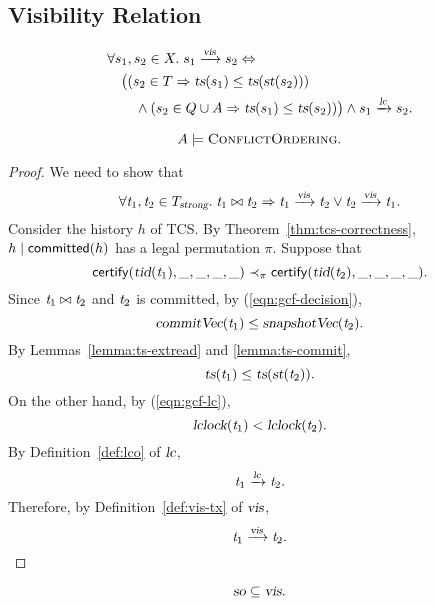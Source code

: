 
\subsection{Visibility Relation}  \label{ss:vis}

\begin{appdefinition} \label{def:vis-tx}
  \begin{align*}
    &\forall \txevents_{1}, \txevents_{2} \in X.\;
      \txevents_{1} \rel{\vis} \txevents_{2} \iff \\
      &\quad \big((\txevents_{2} \in \txs \implies
        \timestamp(\txevents_{1}) \le \timestamp(\startoftx(\txevents_{2}))) \\
        &\quad\quad \land (\txevents_{2} \in \Fence \cup \Attach \implies \timestamp(\txevents_{1}) \le \timestamp(\txevents_{2}))\big)
          \land \txevents_{1} \rel{\lcorder} \txevents_{2}.
  \end{align*}
\end{appdefinition}

\begin{apptheorem} \label{thm:conflictaxiom}
  \[
    A \models \textsc{ConflictOrdering}.
  \]
\end{apptheorem}

\begin{proof} \label{proof:conflictaxiom}
  We need to show that
  \[
    \forall \tvar_{1}, \tvar_{2} \in \strongtxs.\;
      \tvar_{1} \conflict \tvar_{2} \implies \tvar_{1} \rel{\vis} \tvar_{2} \lor \tvar_{2} \rel{\vis} \tvar_{1}.
  \]
  Consider the history $h$ of TCS.
  By Theorem~\ref{thm:tcs-correctness},
  $h \mid {\sf committed}(h)$ has a legal permutation $\pi$.
  Suppose that
  \[
    {\sf certify}(\textsl{tid}(\mathit{t}_{1}), \_, \_, \_, \_) \prec_{\pi}
      {\sf certify}(\textsl{tid}(\mathit{t}_{2}), \_, \_, \_, \_).
  \]
  Since $\mathit{t}_{1} \bowtie \mathit{t}_{2}$ and $\mathit{t}_{2}$ is committed,
  by (\ref{eqn:gcf-decision}),
  \[
    \textsl{commitVec}(\mathit{t}_{1}) \le \textsl{snapshotVec}(\mathit{t}_{2}).
  \]
  By Lemmas~\ref{lemma:ts-extread} and \ref{lemma:ts-commit},
  \[
    \textsl{ts}(\mathit{t}_{1}) \le \textsl{ts}(\textsl{st}(\mathit{t}_{2})).
  \]
  On the other hand, by (\ref{eqn:gcf-lc}),
  \[
    \textsl{lclock}(\mathit{t}_{1}) < \textsl{lclock}(\mathit{t}_{2}).
  \]
  By Definition~\ref{def:lco} of $\textsl{lc}$,
  \[
    \mathit{t}_{1} \xrightarrow{\textsl{lc}} \mathit{t}_{2}.
  \]
  Therefore, by Definition~\ref{def:vis-tx} of $\textsl{vis}$,
  \[
    \mathit{t}_{1} \xrightarrow{\textsl{vis}} \mathit{t}_{2}.
  \]
\end{proof}

\begin{applemma} \label{lemma:so-vis}
  \[
    \textsl{so} \subseteq \textsl{vis}.
  \]
\end{applemma}

